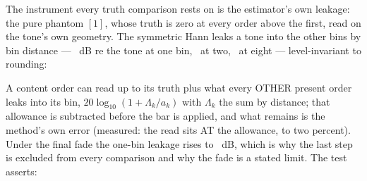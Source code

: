 \documentclass[11pt,a4paper]{article}
\begin{document}
The instrument every truth comparison rests on is the estimator's own
leakage: the pure phantom $[1]$, whose truth is zero at every order above
the first, read on the tone's own geometry. The symmetric Hann leaks a
tone into the other bins by bin distance --- \cparityLeakageOne\ dB re the
tone at one bin, \cparityLeakageTwo\ at two, \cparityLeakageEight\ at
eight --- level-invariant to rounding:
\begin{center}\small\cparityLeakageTable\end{center}
A content order can read up to its truth plus what every OTHER present
order leaks into its bin, $20\log_{10}(1 + \Lambda_k / a_k)$ with
$\Lambda_k$ the sum by distance; that allowance is subtracted before the
bar is applied, and what remains is the method's own error (measured: the
read sits AT the allowance, to two percent). Under the final fade the
one-bin leakage rises to \cparityFadeLeakageOne\ dB, which is why the
last step is excluded from every comparison and why the fade is a stated
limit. \machineFloorNote{} The test asserts:
\end{document}
